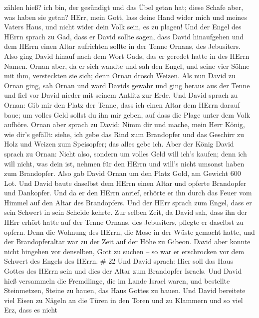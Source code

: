zählen hieß? ich bin, der gesündigt und das Übel getan hat; diese Schafe
aber, was haben sie getan? HErr, mein Gott, lass deine Hand wider mich
und meines Vaters Haus, und nicht wider dein Volk sein, es zu plagen!
 Und der Engel des HErrn sprach zu Gad, dass er David
sollte sagen, dass David hinaufgehen und dem HErrn einen Altar
aufrichten sollte in der Tenne Ornans, des Jebusiters. 
Also ging David hinauf nach dem Wort Gads, das er geredet hatte in des
HErrn Namen.  Ornan aber, da er sich wandte und sah den
Engel, und seine vier Söhne mit ihm, versteckten sie sich; denn Ornan
drosch Weizen.  Als nun David zu Ornan ging, sah Ornan und
ward Davids gewahr und ging heraus aus der Tenne und fiel vor David
nieder mit seinem Antlitz zur Erde.  Und David sprach zu
Ornan: Gib mir den Platz der Tenne, dass ich einen Altar dem HErrn
darauf baue; um volles Geld sollst du ihn mir geben, auf dass die Plage
unter dem Volk aufhöre.  Ornan aber sprach zu David: Nimm
dir und mache, mein Herr König, wie dir's gefällt: siehe, ich gebe das
Rind zum Brandopfer und das Geschirr zu Holz und Weizen zum Speisopfer;
das alles gebe ich.  Aber der König David sprach zu Ornan:
Nicht also, sondern um volles Geld will ich's kaufen; denn ich will
nicht, was dein ist, nehmen für den HErrn und will's nicht umsonst haben
zum Brandopfer.  Also gab David Ornan um den Platz Gold, am
Gewicht 600 Lot.  Und David baute daselbst dem HErrn einen
Altar und opferte Brandopfer und Dankopfer. Und da er den HErrn anrief,
erhörte er ihn durch das Feuer vom Himmel auf den Altar des Brandopfers.
 Und der HErr sprach zum Engel, dass er sein Schwert in
sein Scheide kehrte.  Zur selben Zeit, da David sah, dass
ihn der HErr erhört hatte auf der Tenne Ornans, des Jebusiters, pflegte
er daselbst zu opfern.  Denn die Wohnung des HErrn, die
Mose in der Wüste gemacht hatte, und der Brandopferaltar war zu der Zeit
auf der Höhe zu Gibeon.  David aber konnte nicht hingehen
vor denselben, Gott zu suchen -- so war er erschrocken vor dem Schwert
des Engels des HErrn. \# 22  Und David sprach: Hier soll das
Haus Gottes des HErrn sein und dies der Altar zum Brandopfer Israels.
 Und David hieß versammeln die Fremdlinge, die im Lande
Israel waren, und bestellte Steinmetzen, Steine zu hauen, das Haus
Gottes zu bauen.  Und David bereitete viel Eisen zu Nägeln
an die Türen in den Toren und zu Klammern und so viel Erz, dass es nicht

